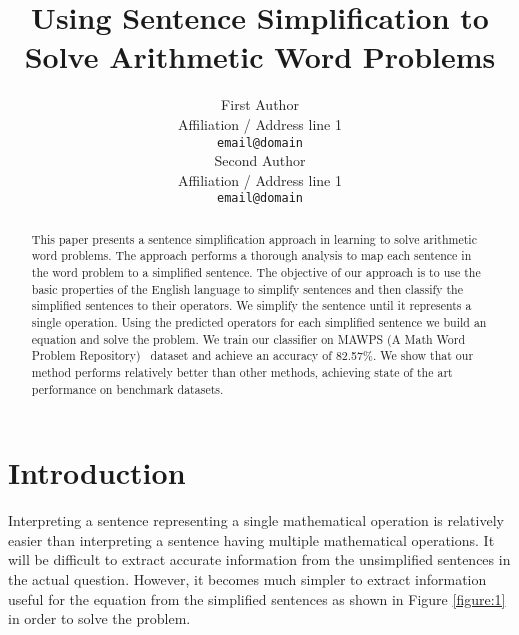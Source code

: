 \documentclass[11pt]{article}
\begin{document}
\title{Using Sentence Simplification to Solve Arithmetic Word Problems}

\author{First Author \\
  Affiliation / Address line 1 \\
  {\tt email@domain} \\\And
  Second Author \\
  Affiliation / Address line 1 \\
  {\tt email@domain} \\}

\date{}
\maketitle

\begin{abstract}
This paper presents a sentence simplification approach in learning to solve arithmetic word problems. The approach performs a thorough analysis to map each sentence in the word problem to a simplified sentence. The objective of our approach is to use the basic properties of the English language to simplify sentences and then classify the simplified sentences to their operators. We simplify the sentence until it represents a single operation. Using the predicted operators for each simplified sentence we build an equation and solve the problem. We train our classifier on MAWPS (A Math Word Problem Repository)~\cite{MAWPS} dataset and achieve an accuracy of 82.57\%. We show that our method performs relatively better than other methods, achieving state of the art performance on benchmark datasets.
\end{abstract}

\section{Introduction}
Interpreting a sentence representing a single mathematical operation is relatively easier than interpreting a sentence having multiple mathematical operations. It will be difficult to extract accurate information from the unsimplified sentences in the actual question. However, it becomes much simpler to extract information useful for the equation from the simplified sentences as shown in Figure \ref{figure:1} in order to solve the problem.
\end{document}
